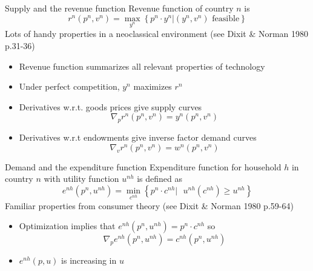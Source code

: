 \documentclass[10pt,notes=hide]{beamer}
\begin{document}
\begin{frame}{Supply and the revenue function}
Revenue function of country $n$ is
\begin{equation*}
r^{n}\left( p^{n},v^{n}\right) =
\max_{y^{n}}\left\{ p^{n} \cdot y^{n}|\left(y^{n},v^{n}\right) \text{ feasible}\right\}
\end{equation*}
Lots of handy properties in a neoclassical environment (see Dixit \& Norman 1980 p.31-36)
\begin{itemize}
	\item Revenue function summarizes all relevant properties of technology
	\item Under perfect competition, $y^n$ maximizes $r^n$
	\item Derivatives w.r.t. goods prices give supply curves
	\begin{equation*}
	\nabla_p r^{n}\left( p^{n},v^{n}\right) = y^{n}\left( p^{n},v^{n}\right)
	\end{equation*}
	\item Derivatives w.r.t endowments give inverse factor demand curves
	\begin{equation*}
	\nabla_v r^{n}\left( p^{n},v^{n}\right) = w^{n}\left( p^{n},v^{n}\right)
	\end{equation*}
\end{itemize}
\end{frame}
\begin{frame}{Demand and the expenditure function}
Expenditure function for household $h$ in country $n$ with utility function $u^{nh}$ is defined as
\begin{equation*}
e^{nh}\left( p^{n},u^{nh}\right) =
\min_{c^{nh}}\left\{ p^{n} \cdot c^{nh}|\text{ }
u^{nh}\left( c^{nh}\right) \geq u^{nh}\right\}
\end{equation*}
Familiar properties from consumer theory (see Dixit \& Norman 1980 p.59-64)
\begin{itemize}
	\item Optimization implies that $e^{nh}\left( p^{n},u^{nh}\right) = p^{n}\cdot c^{nh}$ so
	\begin{equation*}
	\nabla_p e^{nh}\left(p^{n},u^{nh}\right) = c^{nh}\left(p^{n},u^{nh}\right)
	\end{equation*}
	\item $e^{nh}\left( p,u\right)$ is increasing in $u$
\end{itemize}
\end{frame}
\end{document}
